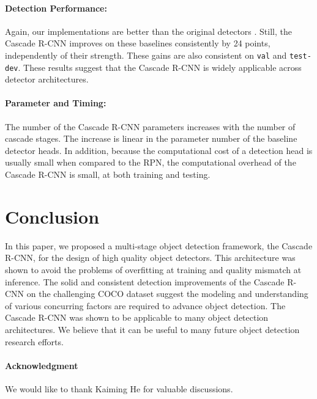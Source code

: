 \documentclass[10pt,twocolumn,letterpaper]{article}
\begin{document}
\paragraph{Detection Performance:} Again, our implementations are better than
the original detectors \cite{DBLP:conf/nips/RenHGS15,DBLP:conf/nips/DaiLHS16,lin2017feature}. Still, the Cascade R-CNN improves on these baselines
consistently by 24 points, independently of their strength.
These gains are also consistent on \texttt{val} and \texttt{test-dev}. These
results suggest that the Cascade R-CNN is widely applicable across
detector architectures.


\paragraph{Parameter and Timing:} The number of the Cascade R-CNN parameters increases with the number of cascade stages. The increase is linear in the parameter number of the baseline detector heads. In addition, because the computational cost of a detection head is usually small when compared to the RPN, the computational overhead of the Cascade R-CNN is small, at both training and testing.


\section{Conclusion}

In this paper, we proposed a multi-stage object detection framework,
the Cascade R-CNN, for the design of high quality object detectors.
This architecture was shown to avoid the problems of overfitting at
training and quality mismatch at inference. The solid and consistent
detection improvements of the Cascade R-CNN on the challenging COCO dataset
suggest the modeling and understanding of various concurring factors
are required to advance object detection. The Cascade R-CNN was shown to be
applicable to many object detection architectures. We believe that it can be
useful to many future object detection research efforts.

\paragraph{Acknowledgment} We would like to thank Kaiming He for valuable discussions.

{\small


}
\end{document}
